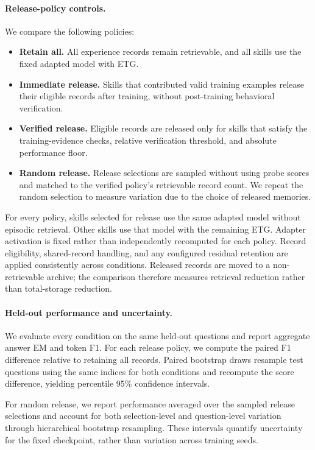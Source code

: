 \paragraph{Release-policy controls.}
We compare the following policies:
\begin{itemize}
    \item \textbf{Retain all.}
    All experience records remain retrievable, and all
    skills use the fixed adapted model with ETG.

    \item \textbf{Immediate release.}
    Skills that contributed valid training examples
    release their eligible records after training,
    without post-training behavioral verification.

    \item \textbf{Verified release.}
    Eligible records are released only for skills that
    satisfy the training-evidence checks, relative
    verification threshold, and absolute performance
    floor.

    \item \textbf{Random release.}
    Release selections are sampled without using probe
    scores and matched to the verified policy's
    retrievable record count.
    We repeat the random selection to measure variation
    due to the choice of released memories.
\end{itemize}

For every policy, skills selected for release use the
same adapted model without episodic retrieval.
Other skills use that model with the remaining ETG.
Adapter activation is fixed rather than independently
recomputed for each policy.
Record eligibility, shared-record handling, and any
configured residual retention are applied consistently
across conditions.
Released records are moved to a non-retrievable archive;
the comparison therefore measures retrieval reduction
rather than total-storage reduction.

\paragraph{Held-out performance and uncertainty.}
We evaluate every condition on the same held-out questions
and report aggregate answer EM and token F1.
For each release policy, we compute the paired F1 difference
relative to retaining all records.
Paired bootstrap draws resample test questions using the
same indices for both conditions and recompute the score
difference, yielding percentile 95\% confidence intervals.

For random release, we report performance averaged over
the sampled release selections and account for both
selection-level and question-level variation through
hierarchical bootstrap resampling.
These intervals quantify uncertainty for the fixed
checkpoint, rather than variation across training seeds.
